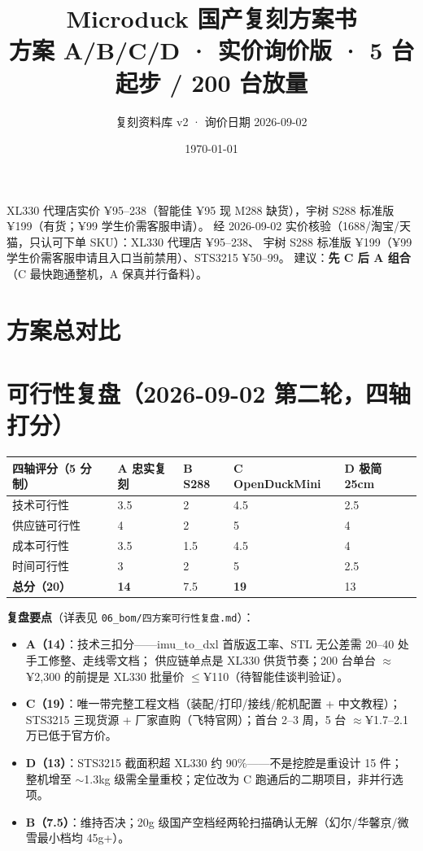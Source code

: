 \documentclass[11pt,a4paper]{ctexart}
\title{\vspace{-1.5cm}\textbf{Microduck 国产复刻方案书}\\[0.3em]\large 方案 A/B/C/D · 实价询价版 · 5 台起步 / 200 台放量}
\author{复刻资料库 v2 · 询价日期 2026-09-02}
\date{\today}
\newcommand{\good}[1]{\textcolor{green!55!black}{#1}}
\newcommand{\bad}[1]{\textcolor{red!75!black}{#1}}
\begin{document}
\maketitle
\thispagestyle{empty}

\begin{center}
\begin{minipage}{0.92\textwidth}\small
\good{XL330 代理店实价 ¥95--238（智能佳 ¥95 现 M288 缺货）}，\good{宇树 S288 标准版 ¥199（有货；¥99 学生价需客服申请）}。
经 2026-09-02 实价核验（1688/淘宝/天猫，只认可下单 SKU）：XL330 代理店 ¥95--238、
宇树 S288 标准版 ¥199（¥99 学生价需客服申请且入口当前禁用）、STS3215 ¥50--99。
建议：\textbf{先 C 后 A 组合}（C 最快跑通整机，A 保真并行备料）。
\end{minipage}
\end{center}

\tableofcontents

\section{方案总对比}

\section{可行性复盘（2026-09-02 第二轮，四轴打分）}

\begin{longtable}{L{3.6cm}L{2.6cm}L{2.6cm}L{2.6cm}L{2.6cm}}
\toprule
\textbf{四轴评分（5 分制）} & \textbf{A 忠实复刻} & \textbf{B S288} & \textbf{C OpenDuckMini} & \textbf{D 极简 25cm} \\
\midrule
技术可行性 & 3.5 & 2 & 4.5 & 2.5 \\
供应链可行性 & 4 & 2 & 5 & 4 \\
成本可行性 & 3.5 & 1.5 & 4.5 & 4 \\
时间可行性 & 3 & 2 & 5 & 2.5 \\
\midrule
\textbf{总分（20）} & \textbf{14} & \bad{7.5} & \good{\textbf{19}} & 13 \\
\bottomrule
\end{longtable}

\noindent\textbf{复盘要点}（详表见 \texttt{06\_bom/四方案可行性复盘.md}）：
\begin{itemize}[nosep,leftmargin=1.5em]
\item \textbf{A（14）}：技术三扣分——imu\_to\_dxl 首版返工率、STL 无公差需 20--40 处手工修整、走线零文档；
供应链单点是 XL330 供货节奏；200 台单台 $\approx$¥2,300 的前提是 XL330 批量价 $\le$¥110（待智能佳谈判验证）。
\item \textbf{C（19）}：唯一带完整工程文档（装配/打印/接线/舵机配置 + 中文教程）；
STS3215 三现货源 + 厂家直购（飞特官网）；\good{首台 2--3 周，5 台 $\approx$¥1.7--2.1 万已低于官方价}。
\item \textbf{D（13）}：STS3215 截面积超 XL330 约 90\%——不是挖腔是重设计 15 件；
整机增至 $\sim$1.3kg 级需全量重校；定位改为 C 跑通后的二期项目，非并行选项。
\item \textbf{B（7.5）}：维持否决；20g 级国产空档经两轮扫描确认无解（幻尔/华馨京/微雪最小档均 45g+）。
\end{itemize}
\end{document}
